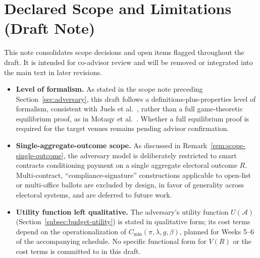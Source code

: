 \documentclass[journal,onecolumn,11pt]{IEEEtran}
\begin{document}
\section*{Declared Scope and Limitations (Draft Note)}

This note consolidates scope decisions and open items flagged throughout the
draft. It is intended for co-advisor review and will be removed or
integrated into the main text in later revisions.

\begin{itemize}

  \item \textbf{Level of formalism.} As stated in the scope note preceding
        Section~\ref{sec:adversary}, this draft follows a
        definitions-plus-properties level of formalism, consistent with
        Juels et al.~\cite{juels2016ring}, rather than a full game-theoretic
        equilibrium proof, as in Motaqy et al.~\cite{motaqy2021bet}. Whether
        a full equilibrium proof is required for the target venues remains
        pending advisor confirmation.

  \item \textbf{Single-aggregate-outcome scope.} As discussed in
        Remark~\ref{rem:scope-single-outcome}, the adversary model is
        deliberately restricted to smart contracts conditioning payment on a
        single aggregate electoral outcome $R$. Multi-contract,
        ``compliance-signature'' constructions applicable to open-list or
        multi-office ballots are excluded by design, in favor of generality
        across electoral systems, and are deferred to future work.

  \item \textbf{Utility function left qualitative.} The adversary's utility
        function $U(\mathcal{A})$ (Section~\ref{subsec:budget-utility}) is
        stated in qualitative form; its cost terms depend on the
        operationalization of $C_{\min}(\pi, \lambda, g, \beta)$, planned for
        Weeks 5--6 of the accompanying schedule. No specific functional form
        for $V(R)$ or the cost terms is committed to in this draft.


\end{itemize}
\end{document}
